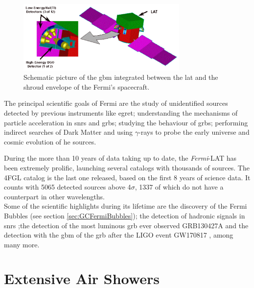 \documentclass[main.tex]{subfiles}
\begin{document}
\begin{itemize}
    
    \begin{figure}[h]
    \centering
    \includegraphics[width=0.75\textwidth]{Pictures/GBM.pdf}
    \caption{Schematic picture of the \gls{gbm} integrated between the \gls{lat} and the shroud envelope of the Fermi's spacecraft.}
    \label{fig:GBM}
    \end{figure}
    
\end{itemize}

The principal scientific goals of Fermi are the study of unidentified sources detected by previous instruments like \gls{egret}; understanding the mechanisms of particle acceleration in \glspl{snr} and \glspl{grb}; studying the behaviour of \glspl{grb}; performing indirect searches of Dark Matter and using $\gamma$-rays to probe the early universe and cosmic evolution of \gls{he} sources.

During the more than 10 years of data taking up to date, the \textit{Fermi}-LAT has been extremely prolific, launching several catalogs with thousands of sources. The 4FGL catalog is the last one released, based on the first 8 years of science data. It counts with 5065 detected sources above 4$\sigma$, 1337 of which do not have a counterpart in other wavelengths.\\
Some of the scientific highlights during its lifetime are the discovery of the Fermi Bubbles (see section \ref{sec:GCFermiBubbles}); the detection of hadronic signals in \glspl{snr} \cite{2013fermionSNRpiondecay};the detection of the most luminous \gls{grb} ever observed GRB130427A \cite{2014fermisuperGRB} and the detection with the \gls{gbm} of the \gls{grb} after the LIGO event GW170817 \cite{grb170817}, among many more. 

\section{Extensive Air Showers} \label{sec:eas}
\end{document}

